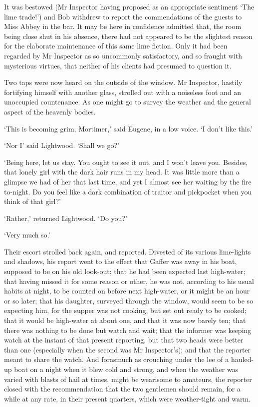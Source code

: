 It was bestowed (Mr Inspector having proposed as an appropriate
sentiment ‘The lime trade!’) and Bob withdrew to report the
commendations of the guests to Miss Abbey in the bar. It may be here
in confidence admitted that, the room being close shut in his absence,
there had not appeared to be the slightest reason for the elaborate
maintenance of this same lime fiction. Only it had been regarded by Mr
Inspector as so uncommonly satisfactory, and so fraught with mysterious
virtues, that neither of his clients had presumed to question it.

Two taps were now heard on the outside of the window. Mr Inspector,
hastily fortifying himself with another glass, strolled out with a
noiseless foot and an unoccupied countenance. As one might go to survey
the weather and the general aspect of the heavenly bodies.

‘This is becoming grim, Mortimer,’ said Eugene, in a low voice. ‘I don’t
like this.’

‘Nor I’ said Lightwood. ‘Shall we go?’

‘Being here, let us stay. You ought to see it out, and I won’t leave
you. Besides, that lonely girl with the dark hair runs in my head. It
was little more than a glimpse we had of her that last time, and yet
I almost see her waiting by the fire to-night. Do you feel like a dark
combination of traitor and pickpocket when you think of that girl?’

‘Rather,’ returned Lightwood. ‘Do you?’

‘Very much so.’

Their escort strolled back again, and reported. Divested of its various
lime-lights and shadows, his report went to the effect that Gaffer was
away in his boat, supposed to be on his old look-out; that he had been
expected last high-water; that having missed it for some reason or
other, he was not, according to his usual habits at night, to be counted
on before next high-water, or it might be an hour or so later; that his
daughter, surveyed through the window, would seem to be so expecting
him, for the supper was not cooking, but set out ready to be cooked;
that it would be high-water at about one, and that it was now barely
ten; that there was nothing to be done but watch and wait; that the
informer was keeping watch at the instant of that present reporting, but
that two heads were better than one (especially when the second was
Mr Inspector’s); and that the reporter meant to share the watch. And
forasmuch as crouching under the lee of a hauled-up boat on a night when
it blew cold and strong, and when the weather was varied with blasts of
hail at times, might be wearisome to amateurs, the reporter closed with
the recommendation that the two gentlemen should remain, for a while at
any rate, in their present quarters, which were weather-tight and warm.

